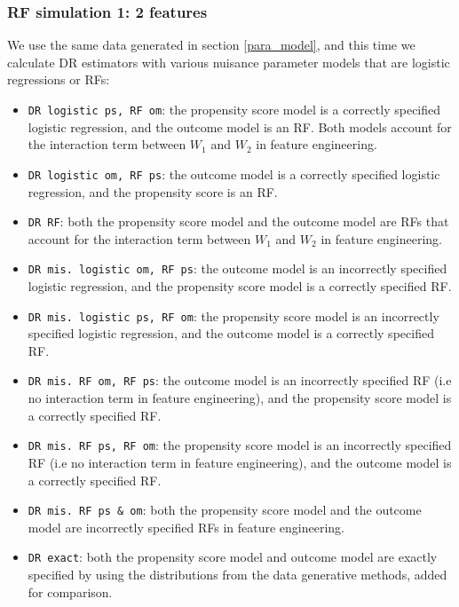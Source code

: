 \documentclass[12pt,twoside]{article}
\begin{document}
\subsubsection{RF simulation 1: 2 features}

We use the same data generated in section \ref{para_model}, and this time we calculate DR estimators with various nuisance parameter models that are logistic regressions or RFs:
\begin{itemize}
    \item \texttt{DR logistic ps, RF om}: the propensity score model is a correctly specified logistic regression, and the outcome model is an RF. Both models account for the interaction term between $W_1$ and $W_2$ in feature engineering.
    \item \texttt{DR logistic om, RF ps}: the outcome model is a correctly specified logistic regression, and the propensity score is an RF.
    \item \texttt{DR RF}: both the propensity score model and the outcome model are RFs that account for the interaction term between $W_1$ and $W_2$ in feature engineering.
    \item \texttt{DR mis. logistic om, RF ps}: the outcome model is an incorrectly specified logistic regression, and the propensity score model is a correctly specified RF.
    \item \texttt{DR mis. logistic ps, RF om}: the propensity score model is an incorrectly specified logistic regression, and the outcome model is a correctly specified RF.
    \item \texttt{DR mis. RF om, RF ps}: the outcome model is an incorrectly specified RF (i.e no interaction term in feature engineering), and the propensity score model is a correctly specified RF.
    \item \texttt{DR mis. RF ps, RF om}: the propensity score model is an incorrectly specified RF (i.e no interaction term in feature engineering), and the outcome model is a correctly specified RF.
    \item \texttt{DR mis. RF ps \& om}: both the propensity score model and the outcome model are incorrectly specified RFs in feature engineering.
    \item \texttt{DR exact}: both the propensity score model and outcome model are exactly specified by using the distributions from the data generative methods, added for comparison.
\end{itemize}
\end{document}
